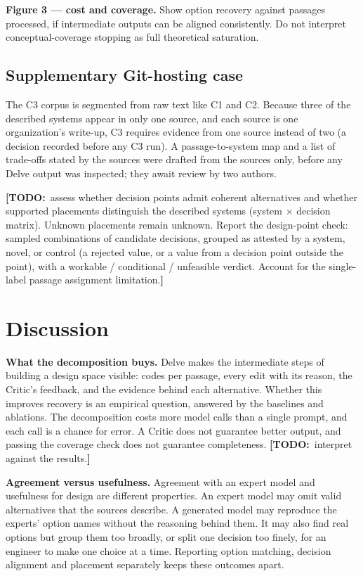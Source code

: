 \documentclass[conference]{IEEEtran}
\newcommand{\todo}[1]{{\color{red}\textbf{[TODO:}~#1\textbf{]}}}
\begin{document}
\textbf{Figure 3 --- cost and coverage.} Show option recovery against passages processed, if intermediate outputs can be aligned consistently. Do not interpret conceptual-coverage stopping as full theoretical saturation.

\subsection{Supplementary Git-hosting case}

The C3 corpus is segmented from raw text like C1 and C2. Because three of the described systems appear in only one source, and each source is one organization's write-up, C3 requires evidence from one source instead of two (a decision recorded before any C3 run). A passage-to-system map and a list of trade-offs stated by the sources were drafted from the sources only, before any Delve output was inspected; they await review by two authors.

\todo{assess whether decision points admit coherent alternatives and whether supported placements distinguish the described systems (system $\times$ decision matrix). Unknown placements remain unknown. Report the design-point check: sampled combinations of candidate decisions, grouped as attested by a system, novel, or control (a rejected value, or a value from a decision point outside the point), with a workable / conditional / unfeasible verdict. Account for the single-label passage assignment limitation.}

\section{Discussion}

\textbf{What the decomposition buys.} Delve makes the intermediate steps of building a design space visible: codes per passage, every edit with its reason, the Critic's feedback, and the evidence behind each alternative. Whether this improves recovery is an empirical question, answered by the baselines and ablations. The decomposition costs more model calls than a single prompt, and each call is a chance for error. A Critic does not guarantee better output, and passing the coverage check does not guarantee completeness. \todo{interpret against the results.}

\textbf{Agreement versus usefulness.} Agreement with an expert model and usefulness for design are different properties. An expert model may omit valid alternatives that the sources describe. A generated model may reproduce the experts' option names without the reasoning behind them. It may also find real options but group them too broadly, or split one decision too finely, for an engineer to make one choice at a time. Reporting option matching, decision alignment and placement separately keeps these outcomes apart.
\end{document}

